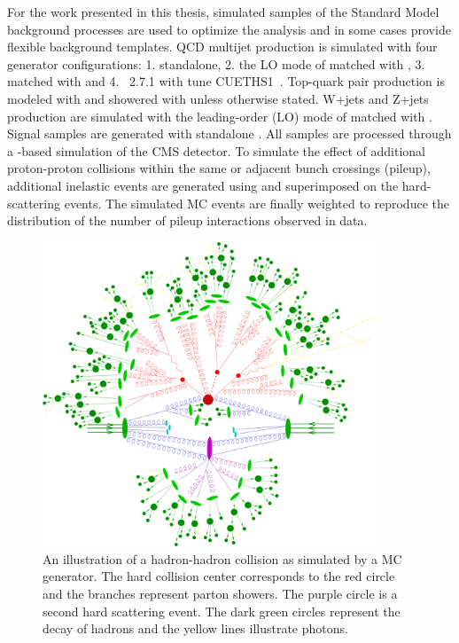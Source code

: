 For the work presented in this thesis, simulated samples of the Standard Model background processes are used to optimize the analysis and in some cases provide flexible background templates. QCD multijet production is simulated with four generator configurations: 1. \PYTHIA standalone, 2. the LO mode of \MADGRAPH matched with \PYTHIA, 3. \POWHEG matched with \PYTHIA and 4. \HERWIG{++}~2.7.1 with tune CUETHS1~\cite{Khachatryan:2015pea}. Top-quark pair production is modeled with \POWHEG and showered with \PYTHIA unless otherwise stated. W+jets and Z+jets production are simulated with the leading-order (LO) mode of \MADGRAPH matched with \PYTHIA. Signal samples are generated with standalone \PYTHIA. All samples are processed through a \GEANTfour-based simulation of the CMS detector. To simulate the effect of additional proton-proton collisions within the same or adjacent bunch crossings (pileup), additional inelastic events are generated using \PYTHIA and superimposed on the hard-scattering events. The simulated MC events are finally weighted to reproduce the distribution of the number of pileup interactions observed in data.
\begin{figure}[h!] 
    \centering 
    \includegraphics[width=0.89\textwidth]{figures/event_reconstruction/MCgen.png}
     \caption{An illustration of a hadron-hadron collision as simulated by a  MC generator. The hard collision center corresponds to the red circle and the branches represent parton showers. The purple circle is a second hard scattering event. The dark green circles represent the decay of hadrons and the yellow lines illustrate photons.}
     \label{fig:objreco:mcgen}
 \end{figure}
 